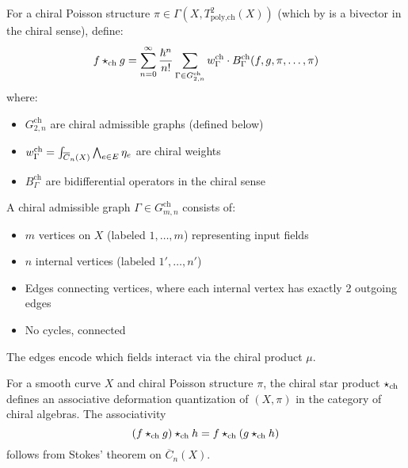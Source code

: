 \begin{definition}
For a chiral Poisson structure $\pi \in \Gamma(X, T^2_{\text{poly,ch}}(X))$ (which by \cite{BD04} is a bivector in the chiral sense), define:
$$f \star_{\text{ch}} g = \sum_{n=0}^\infty \frac{\hbar^n}{n!} \sum_{\Gamma \in G^{\text{ch}}_{2,n}} w_\Gamma^{\text{ch}} \cdot B_\Gamma^{\text{ch}}(f, g, \pi, \ldots, \pi)$$
where:
\begin{itemize}
\item $G^{\text{ch}}_{2,n}$ are chiral admissible graphs (defined below)
\item $w_\Gamma^{\text{ch}} = \int_{\overline{C}_{n}(X)} \bigwedge_{e \in E} \eta_e$ are chiral weights
\item $B_\Gamma^{\text{ch}}$ are bidifferential operators in the chiral sense
\end{itemize}
\end{definition}

\begin{definition}
A chiral admissible graph $\Gamma \in G^{\text{ch}}_{m,n}$ consists of:
\begin{itemize}
\item $m$ vertices on $X$ (labeled $1, \ldots, m$) representing input fields
\item $n$ internal vertices (labeled $1', \ldots, n'$)
\item Edges connecting vertices, where each internal vertex has exactly 2 outgoing edges
\item No cycles, connected
\end{itemize}
The edges encode which fields interact via the chiral product $\mu$.
\end{definition}

\begin{theorem}
\label{thm:chiral-kontsevich}
For a smooth curve $X$ and chiral Poisson structure $\pi$, the chiral star product $\star_{\text{ch}}$ defines an associative deformation quantization of $(X, \pi)$ in the category of chiral algebras. The associativity
$$(f \star_{\text{ch}} g) \star_{\text{ch}} h = f \star_{\text{ch}} (g \star_{\text{ch}} h)$$
follows from Stokes' theorem on $\overline{C}_n(X)$.
\end{theorem}

